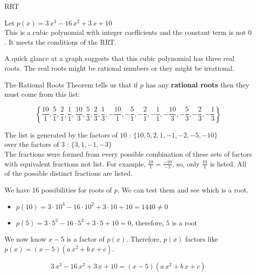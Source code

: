 \documentclass{ximera}
\begin{document}
\begin{example} RRT


Let $p(x) = 3\, x^3 - 16 \, x^2 + 3 \, x + 10$ \\


This is a cubic polynomial with integer coefficients and the constant term is not $0$. It meets the conditions of the RRT.


A quick glance at a graph suggests that this cubic polynomial has three real roots. The real roots might be rational numbers or they might be irrational.

The Rational Roots Theorem tells us that if $p$ has any \textbf{rational roots} then they must come from this list:


\[
\left\{  \frac{10}{1},  \frac{5}{1}, \frac{2}{1}, \frac{1}{1}, \frac{10}{3},  \frac{5}{3}, \frac{2}{3}, \frac{1}{3},   -\frac{10}{1},  -\frac{5}{1}, -\frac{2}{1}, -\frac{1}{1}, -\frac{10}{3},  -\frac{5}{3}, -\frac{2}{3}, -\frac{1}{3}                   \right\}
\]


The list is generated by the factors of $10$ : $\{ 10, 5, 2, 1, -1, -2, -5, -10 \}$ \\

over the factors of $3$ : $\{ 3, 1, -1, -3 \}$ \\


The fractions were formed from every possible combination of these sets of factors with equivalent fractions not list.  For example, $\frac{10}{1} = \frac{-10}{-1}$, so, only $\frac{10}{1}$ is listed.  All of the possible distinct fractions are listed.


We have $16$ possibilities for roots of $p$.  We can test them and see which is a root.


\begin{itemize}
\item $p(10) =  3 \cdot 10^3 - 16 \cdot 10^2 + 3 \cdot 10 + 10 = 1440 \ne 0$ \\
\item $p(5) =  3 \cdot 5^3 - 16 \cdot 5^2 + 3 \cdot 5 + 10 = 0$, therefore,  $5$ is a root\\
\end{itemize}


We now know $x-5$ is a factor of $p(x)$.  Therefore, $p(x)$ factors like $p(x) = (x-5) (a \, x^2 + b \, x + c)$.







\[
3\, x^3 - 16 \, x^2 + 3 \, x + 10  = (x-5) (a \, x^2 + b \, x + c) 
\]



\end{example}
\end{document}
